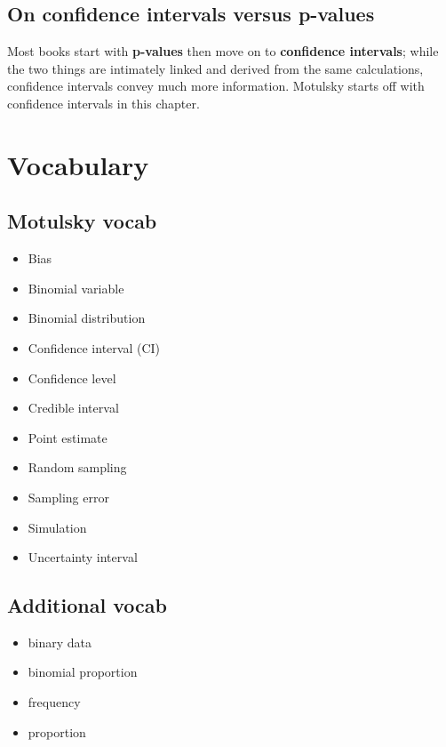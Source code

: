 \documentclass[]{book}
\providecommand{\tightlist}{%
  \setlength{\itemsep}{0pt}\setlength{\parskip}{0pt}}
\theoremstyle{definition}
\theoremstyle{definition}
\theoremstyle{definition}
\theoremstyle{remark}
\begin{document}
\subsection*{On confidence intervals versus
p-values}\label{on-confidence-intervals-versus-p-values}

Most books start with \textbf{p-values} then move on to
\textbf{confidence intervals}; while the two things are intimately
linked and derived from the same calculations, confidence intervals
convey much more information. Motulsky starts off with confidence
intervals in this chapter.

\section*{Vocabulary}\label{vocabulary-2}

\subsection*{Motulsky vocab}\label{motulsky-vocab-2}

\begin{itemize}
\tightlist
\item
  Bias
\item
  Binomial variable
\item
  Binomial distribution
\item
  Confidence interval (CI)
\item
  Confidence level
\item
  Credible interval
\item
  Point estimate
\item
  Random sampling
\item
  Sampling error
\item
  Simulation
\item
  Uncertainty interval
\end{itemize}

\subsection*{Additional vocab}\label{additional-vocab-1}

\begin{itemize}
\tightlist
\item
  binary data
\item
  binomial proportion
\item
  frequency
\item
  proportion
\end{itemize}
\end{document}
